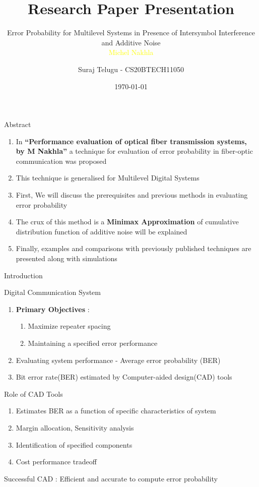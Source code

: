 \documentclass{beamer}
\title{\textbf{Research Paper Presentation}}
\subtitle
{\Large{Error Probability for Multilevel Systems in  Presence of Intersymbol Interference and Additive Noise\\} 
                                        \textcolor{yellow}{Michel Nakhla}}  %
\author{Suraj Telugu - CS20BTECH11050}
\institute{IITH}
\date{\today}
\begin{document}
\begin{frame}
\titlepage
\end{frame}
\begin{frame}{Abstract}
\begin{enumerate}[]
    \item In \textbf{“Performance evaluation of optical fiber transmission systems, by M Nakhla”} a technique for
          evaluation of error probability in fiber-optic communication was proposed
    \item This technique is generalised for Multilevel Digital Systems  
    \item First, We will discuss the prerequisites and previous methods in evaluating error probability
    \item The crux of this method is a \textbf{Minimax Approximation} of 
          cumulative distribution function of additive noise will be explained
    \item Finally, examples and comparisons with previously published techniques are presented along with simulations
\end{enumerate}
\end{frame}
\begin{frame}{Introduction}
\begin{block}{Digital Communication System}
\begin{enumerate}[]
\item \textbf{Primary Objectives} :
\begin{enumerate}[a]
\item Maximize repeater spacing
\item Maintaining a specified error performance
\end{enumerate}
\item Evaluating system performance - Average error probability (BER)
\item Bit error rate(BER) estimated by Computer-aided design(CAD) tools
\end{enumerate}
\end{block}
\begin{block}{Role of CAD Tools}
\begin{enumerate}[]
\item  Estimates BER as a function of specific characteristics of system 
\item  Margin allocation, Sensitivity analysis
\item  Identification of specified components
\item  Cost performance tradeoff
\end{enumerate}
Successful CAD : Efficient and accurate to compute error probability
\end{block}
\end{frame}
\end{document}
